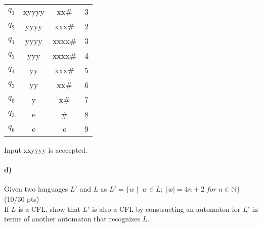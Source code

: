 \documentclass[a4paper,12pt]{article}
\begin{document}
\begin{tcolorbox}
\begin{table}[H]
\begin{tabular}{cccc}
$q_1$ & xyyyy & xx\# & 3 \\
$q_2$ & yyyy & xxx\# & 2 \\
$q_1$ & yyyy & xxxx\# & 3 \\
$q_3$ & yyy & xxxx\# & 4 \\
$q_4$ & yy & xxx\# & 5 \\
$q_3$ & yy & xx\# & 6 \\
$q_5$ & y & x\# & 7 \\
$q_3$ & e & \# & 8 \\
$q_6$ & e & e & 9 
\end{tabular}
\end{table}
Input xxyyyy is accecpted.
\end{tcolorbox}
\vspace{11cm}

\paragraph{d)} Given two languages $L'$ and $L$ as $L'=\{w \mid \; w\in L; \; |w|=4n+2 \; for\; n\in \mathbb{N} \}$
\hfill \small{(10/30 pts)} \\
If $L$ is a CFL, show that $L'$ is also a CFL by constructing an automaton for $L'$ in terms of another automaton that recognizes $L$. \\
\end{document}
